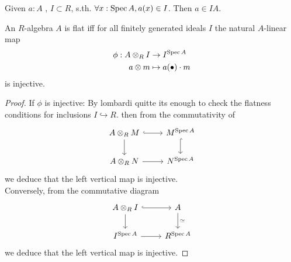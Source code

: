 \documentclass{article}
\begin{document}
\begin{lemma}
	Given $a : A$ , $I \subset R$, s.th. $\forall x : \operatorname{Spec} A , a(x) \in I$. Then $a \in IA$.
\end{lemma}
\begin{prop}
	An $R$-algebra $A$ is flat iff for all finitely generated ideals $I$ the natural $A$-linear map
	\begin{align*}
	\phi: A \otimes_R I &\to I^{\operatorname{Spec} A} \\
	a \otimes m &\mapsto a(\bullet) \cdot m
	\end{align*}
	is injective.
\end{prop}
\begin{proof}

	If $\phi$ is injective: By lombardi quitte its enough to check the flatness conditions for inclusions $I \hookrightarrow R$. then from the commutativity of
	\[\begin{tikzcd}
		{A \otimes_R M} & {M^{\Spec A}} \\
		{A \otimes_R N} & {N^{\Spec A}}
		\arrow[hook, from=1-1, to=1-2]
		\arrow[from=1-1, to=2-1]
		\arrow[hook, from=1-2, to=2-2]
		\arrow[from=2-1, to=2-2]
	\end{tikzcd}\]
we deduce that the left vertical map is injective. \\
Conversely, from the commutative diagram %
\[\begin{tikzcd}
	{A \otimes_R I} & A \\
	{I^{\Spec A}} & {R^{\Spec A}}
	\arrow[hook, from=1-1, to=1-2]
	\arrow[from=1-1, to=2-1]
	\arrow["\simeq", from=1-2, to=2-2]
	\arrow[from=2-1, to=2-2]
\end{tikzcd}\]
we deduce that the left vertical map is injective.


\end{proof}

\end{document}
